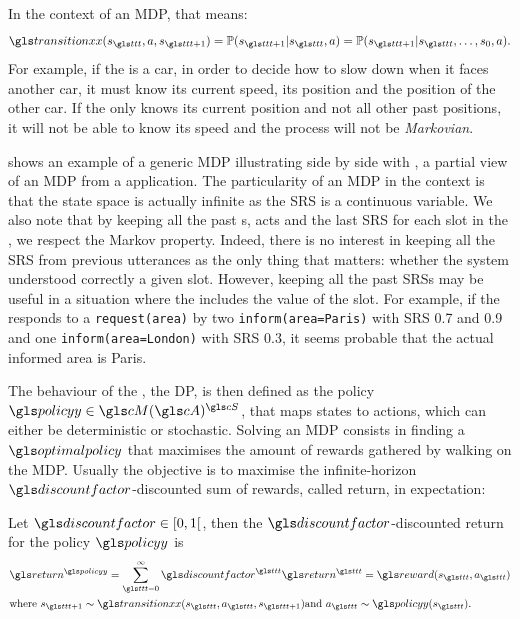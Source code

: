 In the context of an \gls{MDP}, that means:
\begin{equation}
    \transition(s_{\indextransition},a,s_{\indextransition+1}) = \mathbb{P}(s_{\indextransition+1}|s_{\indextransition},a) = \mathbb{P}(s_{\indextransition+1}|s_{\indextransition},\dots,s_{0},a).
\end{equation}
For example, if the  is a car, in order to decide how to slow down when it faces another car, it must know its current speed, its position and the position of the other car. If the  only knows its current position and not all other past positions, it will not be able to know its speed and the process will not be \textit{Markovian}.

 shows an example of a generic \gls{MDP} illustrating  side by side with , a partial view of an \gls{MDP} from a    application. The particularity of an \gls{MDP} in the  context is that the state space is actually infinite as the \acrfull{SRS} is a continuous variable. We also note that by keeping all the past s,  acts and the last \gls{SRS} for each slot in the , we respect the Markov property. Indeed, there is no interest in keeping all the \gls{SRS} from previous utterances as the only thing that matters: whether the system understood correctly a given slot. However, keeping all the past \glspl{SRS} may be useful in a situation where the  includes the value of the slot. For example, if the  responds to a \texttt{request(area)} by two \texttt{inform(area=Paris)} with \gls{SRS} 0.7 and 0.9 and one \texttt{inform(area=London)} with \gls{SRS} 0.3, it seems probable that the actual informed area is Paris.

The behaviour of the  , the \gls{DP}, is then defined as the policy $\policy\in\cM(\cA)^{\cS}$, that maps states to actions, which can either be deterministic or stochastic. Solving an \gls{MDP} consists in finding a  $\optimalpolicy$ that maximises the amount of rewards gathered by walking on the \gls{MDP}. Usually the objective is to maximise the infinite-horizon $\discountfactor$-discounted sum of rewards, called return, in expectation:

\begin{definition}
    Let $\discountfactor \in [0,1[$, then the $\discountfactor$-discounted return for the policy $\policy$ is
    \begin{align}
        &\return^{\policy} = \sum_{\indextransition=0}^\infty \discountfactor^{\indextransition} \return^{\indextransition} = \reward(s_{\indextransition},a_{\indextransition})\\
        & \text{where } s_{\indextransition+1} \sim \transition(s_{\indextransition},a_{\indextransition},s_{\indextransition+1}) \text{and } a_{\indextransition} \sim \policy(s_{\indextransition}).\nonumber
    \end{align}
\end{definition}

